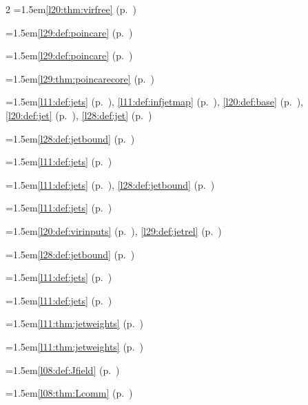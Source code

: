 \begin{multicols}{2}
\hangindent=1.5em\quad \ref{l20:thm:virfree} (p.~\pageref{l20:thm:virfree})\par
\hangindent=1.5em\quad \ref{l29:def:poincare} (p.~\pageref{l29:def:poincare})\par
\hangindent=1.5em\quad \ref{l29:def:poincare} (p.~\pageref{l29:def:poincare})\par
\hangindent=1.5em\quad \ref{l29:thm:poincarecore} (p.~\pageref{l29:thm:poincarecore})\par
\hangindent=1.5em\quad \ref{l11:def:jets} (p.~\pageref{l11:def:jets}), \ref{l11:def:infjetmap} (p.~\pageref{l11:def:infjetmap}), \ref{l20:def:base} (p.~\pageref{l20:def:base}), \ref{l20:def:jet} (p.~\pageref{l20:def:jet}), \ref{l28:def:jet} (p.~\pageref{l28:def:jet})\par
\hangindent=1.5em\quad \ref{l28:def:jetbound} (p.~\pageref{l28:def:jetbound})\par
\hangindent=1.5em\quad \ref{l11:def:jets} (p.~\pageref{l11:def:jets})\par
\hangindent=1.5em\quad \ref{l11:def:jets} (p.~\pageref{l11:def:jets}), \ref{l28:def:jetbound} (p.~\pageref{l28:def:jetbound})\par
\hangindent=1.5em\quad \ref{l11:def:jets} (p.~\pageref{l11:def:jets})\par
\hangindent=1.5em\quad \ref{l20:def:virinputs} (p.~\pageref{l20:def:virinputs}), \ref{l29:def:jetrel} (p.~\pageref{l29:def:jetrel})\par
\hangindent=1.5em\quad \ref{l28:def:jetbound} (p.~\pageref{l28:def:jetbound})\par
\hangindent=1.5em\quad \ref{l11:def:jets} (p.~\pageref{l11:def:jets})\par
\hangindent=1.5em\quad \ref{l11:def:jets} (p.~\pageref{l11:def:jets})\par
\hangindent=1.5em\quad \ref{l11:thm:jetweights} (p.~\pageref{l11:thm:jetweights})\par
\hangindent=1.5em\quad \ref{l11:thm:jetweights} (p.~\pageref{l11:thm:jetweights})\par
\hangindent=1.5em\quad \ref{l08:def:Jfield} (p.~\pageref{l08:def:Jfield})\par
\hangindent=1.5em\quad \ref{l08:thm:Lcomm} (p.~\pageref{l08:thm:Lcomm})\par

\end{multicols}
